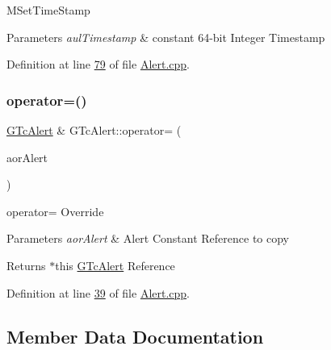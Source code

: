 M\+Set\+Time\+Stamp 
\begin{DoxyParams}{Parameters}
{\em aul\+Timestamp} & constant 64-\/bit Integer Timestamp \\
\hline
\end{DoxyParams}


Definition at line \mbox{\hyperlink{_alert_8cpp_source_l00079}{79}} of file \mbox{\hyperlink{_alert_8cpp_source}{Alert.\+cpp}}.

\mbox{\label{class_g_n_common_1_1_g_n_notification_1_1_g_tc_alert_aba9a3373bd29884b049dfc525f655e5c}} 
\subsubsection{\texorpdfstring{operator=()}{operator=()}}
{\footnotesize\ttfamily \mbox{\hyperlink{class_g_n_common_1_1_g_n_notification_1_1_g_tc_alert}{G\+Tc\+Alert}} \& G\+Tc\+Alert\+::operator= (\begin{DoxyParamCaption}\item[{const \mbox{\hyperlink{class_g_n_common_1_1_g_n_notification_1_1_g_tc_alert}{G\+Tc\+Alert}} \&}]{aor\+Alert }\end{DoxyParamCaption})}

operator= Override 
\begin{DoxyParams}{Parameters}
{\em aor\+Alert} & Alert Constant Reference to copy \\
\hline
\end{DoxyParams}
\begin{DoxyReturn}{Returns}
$\ast$this \mbox{\hyperlink{class_g_n_common_1_1_g_n_notification_1_1_g_tc_alert}{G\+Tc\+Alert}} Reference 
\end{DoxyReturn}


Definition at line \mbox{\hyperlink{_alert_8cpp_source_l00039}{39}} of file \mbox{\hyperlink{_alert_8cpp_source}{Alert.\+cpp}}.



\subsection{Member Data Documentation}
\mbox{\label{class_g_n_common_1_1_g_n_notification_1_1_g_tc_alert_a102266ad89b5f53047fdbf8d180079d9}} 
